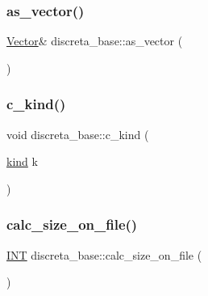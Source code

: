\mbox{\label{classdiscreta__base_a7bdd6cae39c380b128ee9e17e42cf020}} 
\subsubsection{\texorpdfstring{as\+\_\+vector()}{as\_vector()}}
{\footnotesize\ttfamily \mbox{\hyperlink{class_vector}{Vector}}\& discreta\+\_\+base\+::as\+\_\+vector (\begin{DoxyParamCaption}{ }\end{DoxyParamCaption})\hspace{0.3cm}{\ttfamily [inline]}}

\mbox{\label{classdiscreta__base_adc2ff61589c2d083688e7a43f333cb62}} 
\subsubsection{\texorpdfstring{c\+\_\+kind()}{c\_kind()}}
{\footnotesize\ttfamily void discreta\+\_\+base\+::c\+\_\+kind (\begin{DoxyParamCaption}\item[{\mbox{\hyperlink{discreta_8h_aaf25ee7e2306d78c74ec7bc48f092e81}{kind}}}]{k }\end{DoxyParamCaption})}

\mbox{\label{classdiscreta__base_ae342640849a0b5bd6096b8e29c7145ff}} 
\subsubsection{\texorpdfstring{calc\+\_\+size\+\_\+on\+\_\+file()}{calc\_size\_on\_file()}}
{\footnotesize\ttfamily \mbox{\hyperlink{galois_8h_a09fddde158a3a20bd2dcadb609de11dc}{I\+NT}} discreta\+\_\+base\+::calc\+\_\+size\+\_\+on\+\_\+file (\begin{DoxyParamCaption}{ }\end{DoxyParamCaption})}

